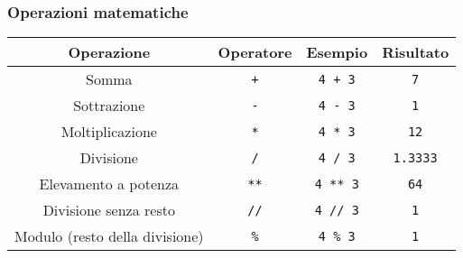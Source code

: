\begin{contentframe}
    \frametitle{Operazioni matematiche}

    \centering
    \begin{tabular}{c|c|c|c}
        Operazione                      & Operatore     & Esempio           & Risultato         \\
        \midrule
        \midrule
        Somma                           & \texttt{+}    & \texttt{4 + 3}    & \texttt{7}        \\
        Sottrazione                     & \texttt{-}    & \texttt{4 - 3}    & \texttt{1}        \\
        Moltiplicazione                 & \texttt{*}    & \texttt{4 * 3}    & \texttt{12}       \\
        Divisione                       & \texttt{/}    & \texttt{4 / 3}    & \texttt{1.3333}   \\
        \midrule
        Elevamento a potenza            & \texttt{**}   & \texttt{4 ** 3}   & \texttt{64}       \\
        Divisione senza resto           & \texttt{//}   & \texttt{4 // 3}   & \texttt{1}        \\
        Modulo (resto della divisione)  & \texttt{\%}   & \texttt{4 \% 3}   & \texttt{1}        \\
    \end{tabular}
\end{contentframe}

